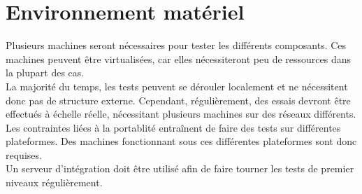 \section{Environnement matériel}
Plusieurs machines seront nécessaires pour tester les différents composants. Ces machines peuvent être virtualisées, car elles nécessiteront peu de ressources dans la plupart des cas.\\

La majorité du temps, les tests peuvent se dérouler localement et ne nécessitent donc pas de structure externe. Cependant, régulièrement, des essais devront être effectués à échelle réelle, nécessitant plusieurs machines sur des réseaux différents.\\

Les contraintes liées à la portablité entraînent de faire des tests sur différentes plateformes. Des machines fonctionnant sous ces différentes plateformes sont donc requises.\\

Un serveur d'intégration doit être utilisé afin de faire tourner les tests de premier niveaux régulièrement.\\
